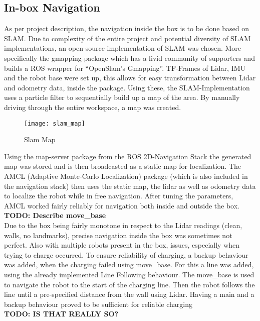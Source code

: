 \subsection{In-box Navigation} \label{sec:in_box_navigation}
As per project description, the navigation inside the box is to be done based on SLAM. Due to complexity of the entire project and potential diversity of SLAM implementations, an open-source implementation of SLAM was chosen. More specifically the gmapping-package \cite{gmapping} which has a livid community of supporters and builds a ROS wrapper for “OpenSlam's Gmapping”\cite{openslam}. TF-Frames of Lidar, IMU and the robot base were set up, this allows for easy transformation between Lidar and odometry data, inside the package. Using these, the SLAM-Implementation uses a particle filter to sequentially build up a map of the area. By manually driving through the entire workspace, a map was created. 
\begin{figure}[H]
	\centering
	\texttt{[image: slam\_map]}
	\caption{Slam Map}
	\label{fig:slam_map}
\end{figure}
Using the map-server package from the ROS 2D-Navigation Stack \cite{navigation_stack} the generated map was stored and is then broadcasted as a static map for localization. The AMCL (Adaptive Monte-Carlo Localization) package (which is also included in the navigation stack) then uses the static map, the lidar as well as odometry data to localize the robot while in free navigation. After tuning the parameters, AMCL worked fairly reliably for navigation both inside and outside the box.\\
\textbf{TODO: Describe move{\_}base}\\
Due to the box being fairly monotone in respect to the Lidar readings (clean, walls, no landmarks), precise navigation inside the box was sometimes not perfect. Also with multiple robots present in the box, issues, especially when trying to charge occurred. To ensure reliability of charging, a backup behaviour was added, when the charging failed using move{\_}base. For this a line was added, using the already implemented Line Following behaviour. The move{\_}base is used to navigate the robot to the start of the charging line. Then the robot follows the line until a pre-specified distance from the wall using Lidar. Having a main and a backup behaviour proved to be sufficient for reliable charging\\
\textbf{TODO: IS THAT REALLY SO?}